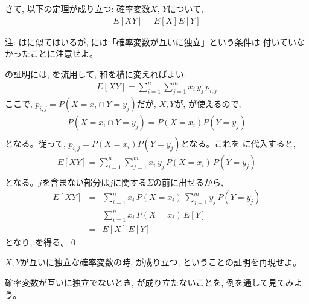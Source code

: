 さて, 以下の定理が成り立つ: 確率変数$X$, $Y$について, 
\begin{eqnarray}E[XY]=E[X]E[Y]\label{eq:expect_X_times_Y}\end{eqnarray}

{\small 注: はに似てはいるが, 
には「確率変数が互いに独立」という条件は
付いていなかったことに注意せよ。\\}

の証明には, を流用して, 和を積に変えればよい:
\begin{eqnarray}
E[XY]=\sum_{i=1}^{n}\sum_{j=1}^{m}x_i\,y_j\,p_{i,j}\label{eq:EXtimesY08}
\end{eqnarray}
ここで, $p_{i,j}=P(X=x_i\cap Y=y_j)$だが, $X, Y$が, 
が使えるので, 
\begin{eqnarray}P(X=x_i\cap Y=y_j)=P(X=x_i)P(Y=y_j)\nonumber\\\end{eqnarray}
となる。従って, $p_{i, j}=P(X=x_i)P(Y=y_j)$となる。これを
に代入すると, 
\begin{eqnarray}
E[XY]=\sum_{i=1}^{n}\sum_{j=1}^{m}x_i\,y_j\,P(X=x_i)\,P(Y=y_j)\nonumber\\\label{eq:EXtimesY10}
\end{eqnarray}
となる。$j$を含まない部分は$j$に関する$\Sigma$の前に出せるから, 
\begin{eqnarray}
E[XY]&=&\sum_{i=1}^{n}x_i\,P(X=x_i)\,\sum_{j=1}^{m}y_j\,P(Y=y_j)\nonumber\\
     &=&\sum_{i=1}^{n}x_i\,P(X=x_i)\,E[Y]\label{eq:EXtimesY14}\\
     &=&E[X]\,E[Y]\label{eq:EXtimesY16}
\end{eqnarray}
となり, を得る。\qed
\mv

\begin{q}\label{q:stat_expect_X_times_Y} $X, Y$が互いに独立な確率変数の時, 
が成り立つ, ということの証明を再現せよ。\end{q}
\mv

確率変数が互いに独立でないとき, が成り立たないことを, 例を通して見てみよう。
\mv

